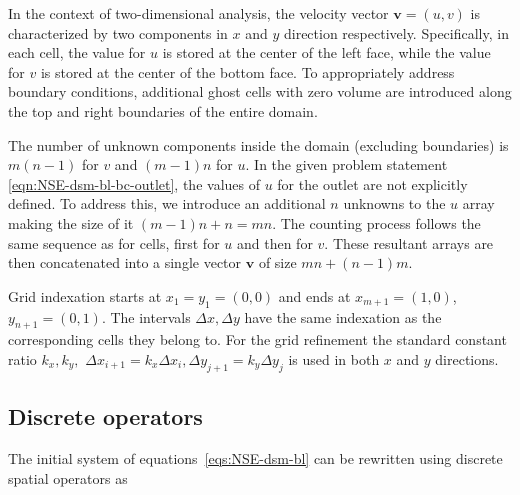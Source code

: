 \documentclass{article}
\begin{document}
In the context of two-dimensional analysis, the velocity vector $\boldsymbol{v}=(u,v)$ is characterized by two components in $x$ and $y$ direction respectively. Specifically, in each cell, the value for $u$ is stored at the center of the left face, while the value for $v$ is stored at the center of the bottom face. To appropriately address boundary conditions, additional ghost cells with zero volume are introduced along the top and right boundaries of the entire domain. 

The number of unknown components inside the domain (excluding boundaries) is $m(n-1)$ for $v$ and $(m-1)n$ for $u$. In the given problem statement \ref{eqn:NSE-dsm-bl-bc-outlet}, the values of $u$ for the outlet are not explicitly defined. To address this, we introduce an additional $n$ unknowns to the $u$ array making the size of it $(m-1)n+n=mn$. The counting process follows the same sequence as for cells, first for $u$ and then for $v$. These resultant arrays are then concatenated into a single vector $\boldsymbol{v}$ of size $mn+(n-1)m$.

Grid indexation starts at $x_1=y_1=(0,0)$ and ends at $x_{m+1}=(1,0)$, $y_{n+1}=(0,1)$. The intervals $\Delta x, \Delta y$ have the same indexation as the corresponding cells they belong to. For the grid refinement the standard constant ratio $k_x,k_y,$ $\Delta x_{i+1}=k_x\Delta x_i,\Delta y_{j+1}=k_y\Delta y_j$ is used in both $x$ and $y$ directions.


\subsection{Discrete operators}

The initial system of equations~\eqref{eqs:NSE-dsm-bl} can be rewritten using discrete spatial operators as
\end{document}
